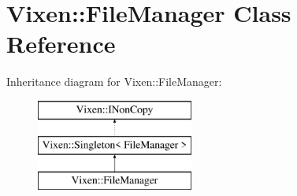 \hypertarget{class_vixen_1_1_file_manager}{}\section{Vixen\+:\+:File\+Manager Class Reference}
\label{class_vixen_1_1_file_manager}
Inheritance diagram for Vixen\+:\+:File\+Manager\+:\begin{figure}[H]
\begin{center}
\leavevmode
\includegraphics[height=3.000000cm]{class_vixen_1_1_file_manager}
\end{center}
\end{figure}
